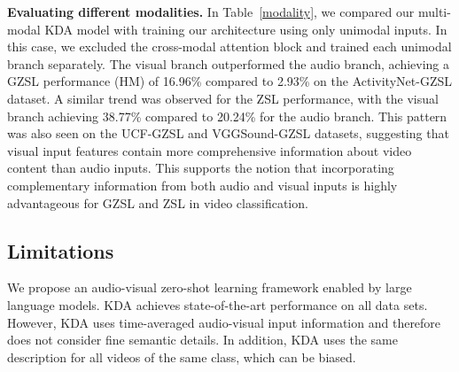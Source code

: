 \documentclass[10pt,twocolumn,letterpaper]{article}
\begin{document}
\noindent
\textbf{Evaluating different modalities.}
In Table~\ref{modality}, we compared our multi-modal KDA model with training our architecture using only unimodal inputs. In this case, we excluded the cross-modal attention block and trained each unimodal branch separately. The visual branch outperformed the audio branch, achieving a GZSL performance (HM) of 16.96\% compared to 2.93\% on the ActivityNet-GZSL dataset. A similar trend was observed for the ZSL performance, with the visual branch achieving 38.77\% compared to 20.24\% for the audio branch. This pattern was also seen on the UCF-GZSL and VGGSound-GZSL datasets, suggesting that visual input features contain more comprehensive information about video content than audio inputs. This supports the notion that incorporating complementary information from both audio and visual inputs is highly advantageous for GZSL and ZSL in video classification.


\subsection{Limitations}
We propose an audio-visual zero-shot learning framework enabled by large language models. KDA achieves state-of-the-art performance on all data sets. However, KDA uses time-averaged audio-visual input information and therefore does not consider fine semantic details. In addition, KDA uses the same description for all videos of the same class, which can be biased.

\begin{table}[t]
    \centering
    \caption{Ablation study: Influence of training KDA with different modalities.}
    \label{modality}
\end{table}
\end{document}
